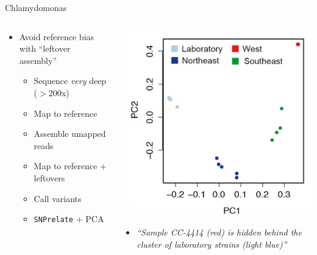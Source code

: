 \documentclass[t]{beamer}
\begin{document}
\begin{frame}{Chlamydomonas}
  \begin{columns}[t]
    \begin{column}{0.5\textwidth}
        \begin{itemize}
          \item Avoid reference bias with ``leftover assembly''
              \autocite{flowers_whole-genome_2015}
            \begin{itemize}
              \item Sequence \textit{very} deep ($> 200$x)
              \item Map to reference
              \item Assemble umapped reads
              \item Map to reference + leftovers
              \item Call variants
              \item \texttt{SNPrelate} + PCA
            \end{itemize}
        \end{itemize}
    \end{column}
    \begin{column}{0.5\textwidth}
      \begin{center}
        \includegraphics[width=\textwidth]{img/flowers.png}
        \begin{itemize}
          \item[] \tiny{\textit{``Sample CC-4414 (red) is hidden behind the cluster of laboratory
            strains (light blue)''}}
        \end{itemize}
      \end{center}
    \end{column}
  \end{columns}
\end{frame}
\end{document}
